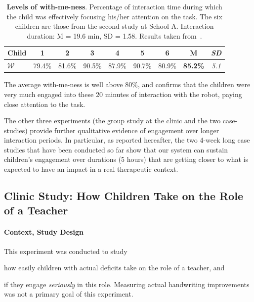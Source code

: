 \documentclass{article}
\begin{document}
\begin{table}[h!]
    \centering
    \caption{\textbf{Levels of with-me-ness}. Percentage of interaction time
        during which the child was effectively focusing his/her attention on the
        task. The six children are those from the second study at School A.
        Interaction duration: M = 19.6 min, SD = 1.58. Results
        taken from~\cite{lemaignan2016realtime}.}

    \begin{tabular}{p{1cm}cccccccc}
        \toprule
        \bf Child & 1 & 2 & 3 & 4 & 5 & 6 & {\bf M} & {\it SD} \\
        \midrule
        $\mathcal{W}$ & 79.4\% & 81.6\%  & 90.5\% & 87.9\% & 90.7\% & 80.9\% & {\bf 85.2\%} & {\it 5.1} \\ 
        \bottomrule
    \end{tabular}
    \label{tab:results-with-me-ness}
\end{table}

The average with-me-ness is well above 80\%, and confirms that the children
were very much engaged into these 20 minutes of interaction with the robot,
paying close attention to the task.

The other three experiments (the group study at the clinic and the two
case-studies) provide further qualitative evidence of engagement over longer
interaction periods. In particular, as reported hereafter, the two 4-week long
case studies that have been conducted so far show that our system can sustain
children's engagement over durations (5 hours) that are getting closer to what is
expected to have an impact in a real therapeutic context.

\subsection{Clinic Study: How Children Take on the Role of a Teacher}\label{normandie}

\paragraph{Context, Study Design}

\begin{inparaenum}[\itshape 1\upshape)]
This experiment was conducted to study \item how easily children with actual
deficits take on the role of a teacher, and \item if they engage
\emph{seriously} in this role. Measuring actual handwriting improvements was
not a primary goal of this experiment.
\end{inparaenum}
\end{document}

